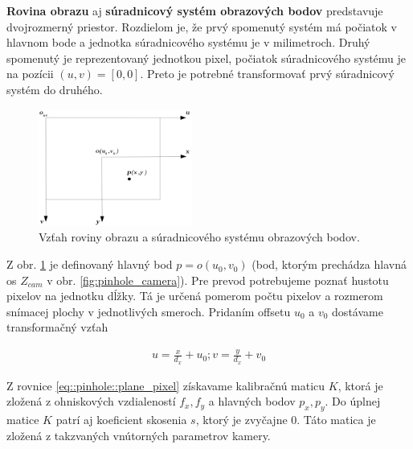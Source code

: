 \textbf{Rovina obrazu} aj \textbf{súradnicový systém obrazových bodov} predstavuje dvojrozmerný priestor. Rozdielom je, že prvý spomenutý systém má počiatok v hlavnom bode a jednotka súradnicového systému je v milimetroch. Druhý spomenutý je reprezentovaný jednotkou pixel, počiatok súradnicového systému je na pozícii $\left(u,v\right)=\left[0,0\right]$. Preto je potrebné transformovať prvý súradnicový systém do druhého. 

\begin{figure}[h]
	\centering
	\includegraphics[width=0.45\textwidth]{figures/plane_pixel.jpg} 
	\caption{Vzťah roviny obrazu a súradnicového systému obrazových bodov.}
	\label{fig:plane_pixel}
\end{figure}

Z obr. \ref{fig:plane_pixel} je definovaný hlavný bod $p=o(u_0,v_0)$ (bod, ktorým prechádza hlavná os $Z_{cam}$ v obr. \ref{fig:pinhole_camera}). Pre prevod potrebujeme poznať hustotu pixelov na jednotku dĺžky. Tá je určená pomerom počtu pixelov a rozmerom snímacej plochy v jednotlivých smeroch. Pridaním offsetu $u_0$ a $v_0$ dostávame transformačný vzťah

\begin{equation}
\label{eq::pinhole::plane_pixel}
\begin{aligned}
u=\frac{x}{d_x} + u_0; v=\frac{y}{d_x} + v_0
\end{aligned}
\end{equation}

Z rovnice \ref{eq::pinhole::plane_pixel} získavame kalibračnú maticu $K$, ktorá je zložená z ohniskových vzdialeností $f_x, f_y$ a hlavných bodov $p_x, p_y$. Do úplnej matice $K$ patrí aj koeficient skosenia $s$, ktorý je zvyčajne 0. Táto matica je zložená z takzvaných vnútorných parametrov kamery.

